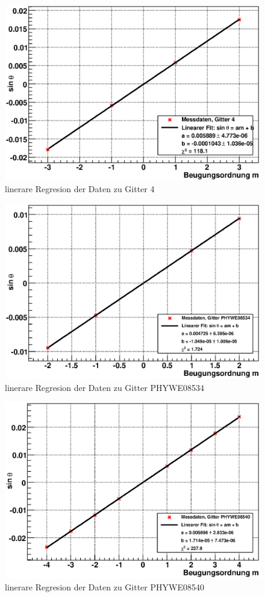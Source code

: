 \documentclass[12pt]{article}
\begin{document}
\begin{figure}[H]  
\centering
\includegraphics[width=0.7\linewidth]{pictures/gitter4.eps}
\caption{linerare Regresion der Daten zu Gitter 4}
\end{figure}

\begin{figure}[H]  
\centering
\includegraphics[width=0.7\linewidth]{pictures/phywe08534.eps}
\caption{linerare Regresion der Daten zu Gitter PHYWE08534}
\end{figure}

\begin{figure}[H]  
\centering
\includegraphics[width=0.7\linewidth]{pictures/phywe08540.eps}
\caption{linerare Regresion der Daten zu Gitter PHYWE08540}
\end{figure}
\end{document}
